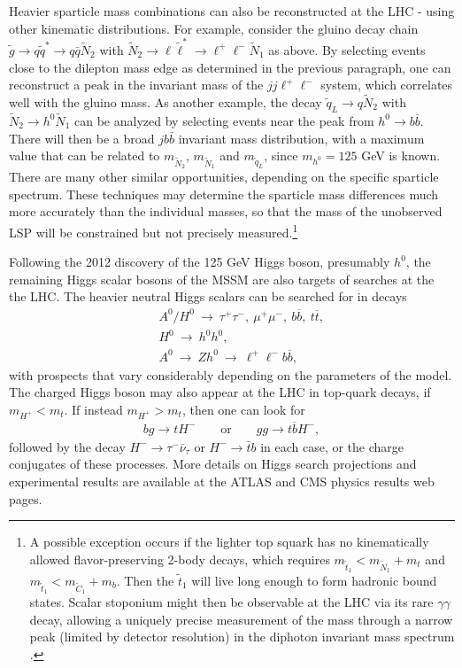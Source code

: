 \documentclass[12pt]{article}
\def\beq{\begin{eqnarray}}
\def\eeq{\end{eqnarray}}
\def\stilde{\widetilde}
\begin{document}
Heavier sparticle mass combinations can also be reconstructed at the LHC 
\cite{ATLASTDR}-\cite{Kawagoe}
using other kinematic 
distributions. For example, consider the gluino decay chain $\stilde g 
\rightarrow q \stilde q^* \rightarrow q \bar q \stilde N_2$ with $\stilde 
N_2 \rightarrow \ell \stilde \ell^* \rightarrow \ell^+ \ell^- \stilde N_1$ 
as above. By selecting events close to the dilepton mass edge as 
determined in the previous paragraph, one can reconstruct a peak in the 
invariant mass of the $jj\ell^+\ell^-$ system, which correlates well with 
the gluino mass. As another example, the decay $\stilde q_L \rightarrow q 
\stilde N_2$ with $\stilde N_2 \rightarrow h^0 \stilde N_1$ can be 
analyzed by selecting events near the peak from $h^0 \rightarrow b 
\overline b$. There will then be a broad $jb\bar b$ invariant mass 
distribution, with a maximum value that can be related to $m_{\tilde 
N_2}$, $m_{\tilde N_1}$ and $m_{\tilde q_L}$, since $m_{h^0} = 125$ GeV is known. 
There are many other similar opportunities, depending on the specific sparticle 
spectrum. These techniques may determine the sparticle mass 
differences much more accurately than the individual masses, so that the mass of 
the unobserved LSP will be constrained but not precisely 
measured.\footnote{A possible exception occurs if the lighter 
top squark has no 
kinematically allowed flavor-preserving 2-body decays, which requires
$m_{\tilde t_1} < m_{\tilde N_1} + m_t$ and 
$m_{\tilde t_1} < m_{\tilde C_1} + m_b$. Then the $\tilde t_1$ will 
live long enough to form
hadronic bound states. Scalar stoponium
might then be observable at the LHC via its rare $\gamma\gamma$ decay,
allowing a uniquely precise measurement of the mass through
a narrow peak (limited by detector resolution) in the diphoton
invariant mass spectrum \cite{Drees:1993yr,stoponium2}.}

Following the 2012 discovery of the 125 GeV Higgs boson, presumably $h^0$, the remaining
Higgs scalar bosons of the MSSM are also targets of searches at the 
the LHC. The heavier neutral Higgs scalars can be searched for in decays
\beq
&&
A^0/H^0 \>\rightarrow\> \tau^+\tau^-,\> \mu^+\mu^-,\> b\overline 
b,\>t\overline t,
\\
&&
H^0 \>\rightarrow\> h^0 h^0,
\\
&&
A^0 \>\rightarrow\> Z h^0 \>\rightarrow\> \ell^+ \ell^- b \overline b,
\eeq
with prospects that vary considerably depending on the parameters of the 
model. The charged Higgs boson may also appear at the LHC in 
top-quark decays, if $m_{H^+} < m_t$. 
If instead $m_{H^+} > m_t$, then one can look for
\beq
bg \rightarrow t H^-
\qquad\mbox{or}\qquad
gg \rightarrow t \overline b H^-,
\eeq
followed by the decay $H^- \rightarrow \tau^- \bar \nu_\tau$ or
$H^- \rightarrow \bar t b$ in each case, or the charge conjugates of these processes. 
More details on Higgs search projections and experimental results are 
available at the ATLAS and CMS physics results web pages.
\end{document}
